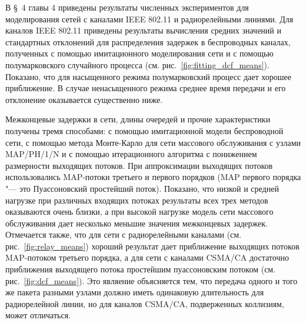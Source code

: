 
В \S~4 главы 4 приведены результаты численных экспериментов для моделирования сетей с каналами IEEE 802.11 и радиорелейными линиями. Для каналов IEEE 802.11 приведены результаты вычисления средних значений и стандартных отклонений для распределения задержек в беспроводных каналах, полученных с помощью имитационного моделирования сети и с помощью полумарковского случайного процесса (см. рис.~\ref{fig:fitting_dcf_means}). Показано, что для насыщенного режима полумарковский процесс дает хорошее приближение. В случае ненасыщенного режима среднее время передачи и его отклонение оказывается существенно ниже.



Межконцевые задержки в сети, длины очередей и прочие характеристики получены тремя способами: с помощью имитационной модели беспроводной сети, с помощью метода Монте-Карло для сети массового обслуживания с узлами MAP/PH/1/N и с помощью итерационного алгоритма с понижением размерности выходящих потоков. При аппроксимации выходящих потоков использовались MAP-потоки третьего и первого порядков (MAP первого порядка "--- это Пуассоновский простейший поток). Показано, что низкой и средней нагрузке при различных входящих потоках результаты всех трех методов оказываются очень близки, а при высокой нагрузке модель сети массового обслуживания дает несколько меньшие значения межконцевых задержек. Отмечается также, что для сети с радиорелейными каналами (см. рис.~\ref{fig:relay_means}) хороший результат дает приближение выходящих потоков MAP-потоком третьего порядка, а для сети с каналами CSMA/CA достаточно приближения выходящего потока простейшим пуассоновским потоком (см. рис.~\ref{fig:dcf_means}). Это являение объясняется тем, что передача одного и того же пакета разными узлами должно иметь одинаковую длительность для радиорелейной линии, но для каналов CSMA/CA, подверженных коллизиям, может отличаться.

